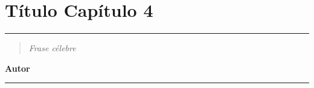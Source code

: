 \chapter{\label{cap:4}Título Capítulo 4}

\noindent
\rule{\linewidth}{1 pt}
\begin{flushright}
\begin{quotation}
\small{
\textit{Frase célebre}}
\end{quotation}
\bf{Autor}
\end{flushright}
\noindent
\rule{\linewidth}{1 pt}\\
\vspace{1cm}
